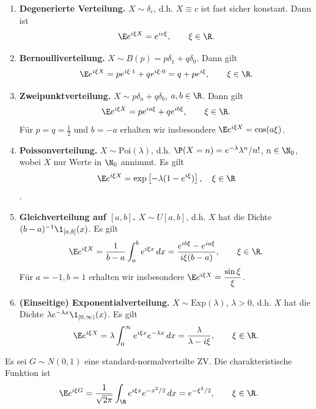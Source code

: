 \documentclass[11pt, a4paper]{article}
\begin{document}
\begin{example}[Wichtige CF] \Theorem \mbox{}
    \begin{enumerate}[label=\alph*)]
        \item \textbf{Degenerierte Verteilung.} $X \sim \delta_c$, d.h. $X \equiv c$ ist fast sicher konstant. Dann ist
        $$\E e^{i\xi X} = e^{ic\xi}, \qquad \xi \in \R.$$

        \item \textbf{Bernoulliverteilung.} $X \sim B(p) = p\delta_1 + q\delta_0$. Dann gilt
        $$\E e^{i\xi X} = p e^{i\xi \cdot 1} + q e^{i\xi \cdot 0} = q + p e^{i\xi}, \qquad \xi \in \R.$$

        \item \textbf{Zweipunktverteilung.} $X \sim p\delta_a + q\delta_b$, $a, b \in \R$. Dann gilt
        $$\E e^{i\xi X} = p e^{ia\xi} + q e^{ib\xi}, \qquad \xi \in \R.$$
        Für $p = q = \frac{1}{2}$ und $b = -a$ erhalten wir insbesondere $\E e^{i\xi X} = \cos(a\xi)$.

        \item \textbf{Poissonverteilung.} $X \sim \text{Poi}(\lambda)$, d.h. $\P(X = n) = e^{-\lambda} \lambda^n/n!$, $n \in \N_0$, wobei $X$ nur Werte in $\N_0$ annimmt. Es gilt $$\E e^{i\xi X} = \exp\left[-\lambda(1 - e^{i\xi})\right], \quad \xi \in \R$$. 

        \item \textbf{Gleichverteilung auf $[a,b]$.} $X \sim U[a,b]$, d.h. $X$ hat die Dichte $(b-a)^{-1} \1_{[a,b]}(x)$. Es gilt
        $$\E e^{i\xi X} = \frac{1}{b-a} \int_a^b e^{i\xi x} \, dx = \frac{e^{ib\xi} - e^{ia\xi}}{i\xi(b-a)}, \qquad \xi \in \R.$$
        Für $a=-1, b=1$ erhalten wir insbesondere $\E e^{i\xi X} = \dfrac{\sin \xi}{\xi}$.

        \item \textbf{(Einseitige) Exponentialverteilung.} $X \sim \text{Exp}(\lambda)$, $\lambda > 0$, d.h. $X$ hat die Dichte $\lambda e^{-\lambda x} \1_{[0,\infty)}(x)$. Es gilt
        $$\E e^{i\xi X} = \lambda \int_0^{\infty} e^{i\xi x} e^{-\lambda x} \, dx = \frac{\lambda}{\lambda - i\xi}, \qquad \xi \in \R.$$
    \end{enumerate}
\end{example}

\begin{lemma} \Theorem
    Es sei $G \sim N(0,1)$ eine standard-normalverteilte ZV. Die charakteristische Funktion ist
    $$\E e^{i\xi G} = \frac{1}{\sqrt{2\pi}} \int_{\R} e^{i\xi x} e^{-x^2/2} \, dx = e^{-\xi^2/2}, \qquad \xi \in \R.$$
\end{lemma}
\end{document}
